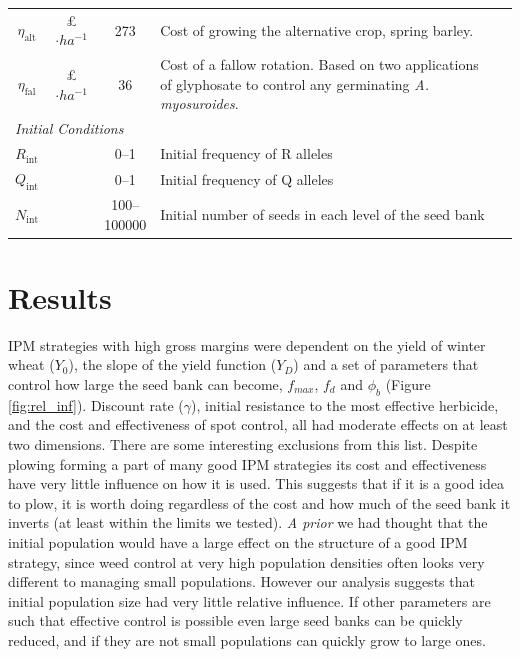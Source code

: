 \documentclass[12pt, a4paper]{article}
\begin{document}
\begin{longtable}{c c c p{5cm} p{4cm}}
	 $\eta_\text{alt}$ & \pounds$\cdot ha^{-1}$ & 273 & Cost of growing the alternative crop, spring barley. & \citet[pp.~12]{Nix2016}\\	    
	 $\eta_\text{fal}$ & \pounds$\cdot ha^{-1}$ & 36 & Cost of a fallow rotation. Based on two applications of glyphosate to control any germinating \textit{A. myosuroides}. &  \citet[pp.~202 and 284]{Nix2016}\\
	\multicolumn{5}{l}{\textit{Initial Conditions}}\\
	$R_\text{int}$ & & 0--1 & Initial frequency of R alleles & \\
	$Q_\text{int}$ & & 0--1 & Initial frequency of Q alleles & \\ 
	$N_\text{int}$ & & \makecell[t]{100--\\100000} & Initial number of seeds in each level of the seed bank & \\
	\hline
\end{longtable}

\section*{Results}
IPM strategies with high gross margins were dependent on the yield of winter wheat ($Y_0$), the slope of the yield function ($Y_D$) and a set of parameters that control how large the seed bank  can become, $f_{max}$, $f_d$ and $\phi_b$ (Figure \ref{fig:rel_inf}). Discount rate ($\gamma$), initial resistance to the most effective herbicide, and the cost and effectiveness of spot control, all had moderate effects on at least two dimensions. There are some interesting exclusions from this list. Despite plowing forming a part of many good IPM strategies its cost and effectiveness have very little influence on how it is used. This suggests that if it is a good idea to plow, it is worth doing regardless of the cost and how much of the seed bank it inverts (at least within the limits we tested). \textit{A prior} we had thought that the initial population would have a large effect on the structure of a good IPM strategy, since weed control at very high population densities often looks very different to managing small populations. However our analysis suggests that initial population size had very little relative influence. If other parameters are such that effective control is possible even large seed banks can be quickly reduced, and if they are not small populations can quickly grow to large ones.   
     
\end{document}
